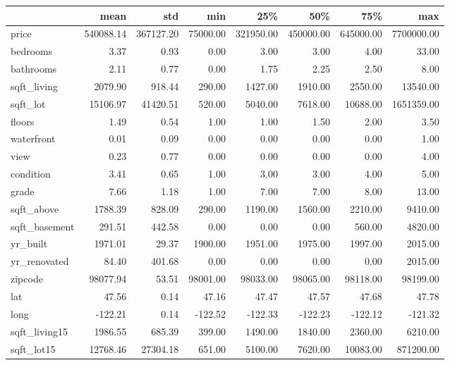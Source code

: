 \begin{tabular}{lrrrrrrr}
\toprule
{} &       mean &        std &       min &        25\% &        50\% &        75\% &         max \\
\midrule
price         &  540088.14 &  367127.20 &  75000.00 &  321950.00 &  450000.00 &  645000.00 &  7700000.00 \\
bedrooms      &       3.37 &       0.93 &      0.00 &       3.00 &       3.00 &       4.00 &       33.00 \\
bathrooms     &       2.11 &       0.77 &      0.00 &       1.75 &       2.25 &       2.50 &        8.00 \\
sqft\_living   &    2079.90 &     918.44 &    290.00 &    1427.00 &    1910.00 &    2550.00 &    13540.00 \\
sqft\_lot      &   15106.97 &   41420.51 &    520.00 &    5040.00 &    7618.00 &   10688.00 &  1651359.00 \\
floors        &       1.49 &       0.54 &      1.00 &       1.00 &       1.50 &       2.00 &        3.50 \\
waterfront    &       0.01 &       0.09 &      0.00 &       0.00 &       0.00 &       0.00 &        1.00 \\
view          &       0.23 &       0.77 &      0.00 &       0.00 &       0.00 &       0.00 &        4.00 \\
condition     &       3.41 &       0.65 &      1.00 &       3.00 &       3.00 &       4.00 &        5.00 \\
grade         &       7.66 &       1.18 &      1.00 &       7.00 &       7.00 &       8.00 &       13.00 \\
sqft\_above    &    1788.39 &     828.09 &    290.00 &    1190.00 &    1560.00 &    2210.00 &     9410.00 \\
sqft\_basement &     291.51 &     442.58 &      0.00 &       0.00 &       0.00 &     560.00 &     4820.00 \\
yr\_built      &    1971.01 &      29.37 &   1900.00 &    1951.00 &    1975.00 &    1997.00 &     2015.00 \\
yr\_renovated  &      84.40 &     401.68 &      0.00 &       0.00 &       0.00 &       0.00 &     2015.00 \\
zipcode       &   98077.94 &      53.51 &  98001.00 &   98033.00 &   98065.00 &   98118.00 &    98199.00 \\
lat           &      47.56 &       0.14 &     47.16 &      47.47 &      47.57 &      47.68 &       47.78 \\
long          &    -122.21 &       0.14 &   -122.52 &    -122.33 &    -122.23 &    -122.12 &     -121.32 \\
sqft\_living15 &    1986.55 &     685.39 &    399.00 &    1490.00 &    1840.00 &    2360.00 &     6210.00 \\
sqft\_lot15    &   12768.46 &   27304.18 &    651.00 &    5100.00 &    7620.00 &   10083.00 &   871200.00 \\
\bottomrule
\end{tabular}
